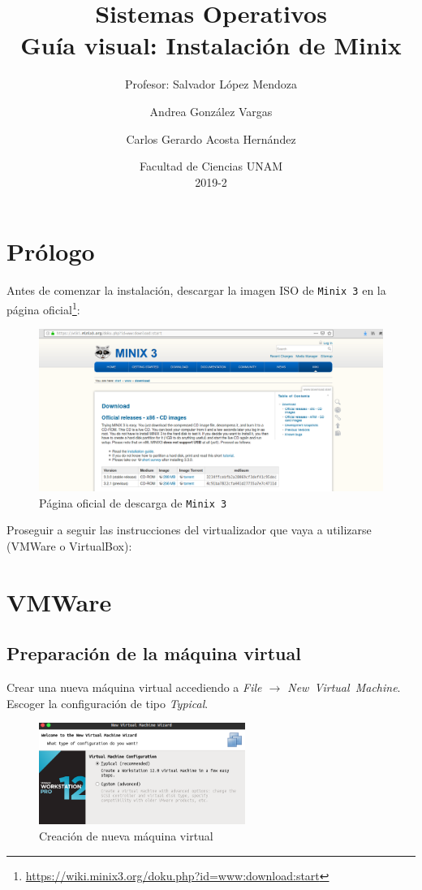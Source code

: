 \documentclass[12pt]{scrartcl}
\title{Sistemas Operativos\\ Guía visual: Instalación de Minix}
\subtitle{Profesor: Salvador López Mendoza }
\author{Andrea González Vargas \and Carlos Gerardo Acosta Hernández}
\date{Facultad de Ciencias UNAM \\ 2019-2}
\begin{document}
\maketitle


\tableofcontents
\newpage
\section{Prólogo}\label{prol}
Antes de comenzar la instalación, descargar la imagen ISO de \texttt{Minix 3} en la página oficial\footnote{\url{https://wiki.minix3.org/doku.php?id=www:download:start}}:
\begin{figure}[H]
  \centering
  \includegraphics[width=\textwidth]{vm/min00.png}
  \caption{Página oficial de descarga de \texttt{Minix 3}}
\end{figure}

Proseguir a seguir las instrucciones del virtualizador que vaya a utilizarse (VMWare o VirtualBox):
\newpage

\section{VMWare}

\subsection{Preparación de la máquina virtual}

Crear una nueva máquina virtual accediendo a \textit{File $\rightarrow$ New\ Virtual\ Machine}.\\

Escoger la configuración de tipo \textit{Typical}.
\begin{figure}[H]
  \centering
  \includegraphics[width=0.6\textwidth]{vm/min01.png}
  \caption{Creación de nueva máquina virtual}
\end{figure}
\end{document}
